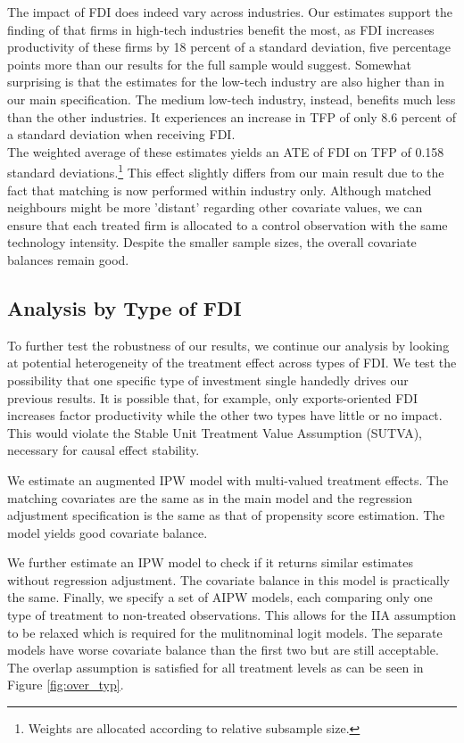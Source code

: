\documentclass[a4paper,11pt]{scrartcl}
\begin{document}
The impact of FDI does indeed vary across industries. Our estimates support the finding of \citet{Keller2009} that firms in high-tech industries benefit the most, as FDI increases productivity of these firms by 18 percent of a standard deviation, five percentage points more than our results for the full sample would suggest. Somewhat surprising is that the estimates for the low-tech industry are also higher than in our main specification. The medium low-tech industry, instead, benefits much less than the other industries. It experiences an increase in TFP of only 8.6 percent of a standard deviation when receiving FDI. \\

The weighted average of these estimates yields an ATE of FDI on TFP of 0.158 standard deviations.\footnote{Weights are allocated according to relative subsample size.} This effect slightly differs from our main result due to the fact that matching is now performed within industry only. Although matched neighbours might be more 'distant' regarding other covariate values, we can ensure that each treated firm is allocated to a control observation with the same technology intensity. Despite the smaller sample sizes, the overall covariate balances remain good. 


\subsection{Analysis by Type of FDI}

To further test the robustness of our results, we continue our analysis by looking at potential heterogeneity of the treatment effect across types of FDI. We test the possibility that one specific type of investment single handedly drives our previous results. It is possible that, for example, only exports-oriented FDI increases factor productivity while the other two types have little or no impact. This would violate the Stable Unit Treatment Value Assumption (SUTVA), necessary for causal effect stability. 

We estimate an augmented IPW model with multi-valued treatment effects. The matching covariates are the same as in the main model and the regression adjustment specification is the same as that of propensity score estimation. The model yields good covariate balance.

We further estimate an IPW model to check if it returns similar estimates without regression adjustment. The covariate balance in this model is practically the same. Finally, we specify a set of AIPW models, each comparing only one type of treatment to non-treated observations. This allows for the IIA assumption to be relaxed which is required for the mulitnominal logit models. The separate models have worse covariate balance than the first two but are still acceptable. The overlap assumption is satisfied for all treatment levels as can be seen in Figure \ref{fig:over_typ}. 
\end{document}
